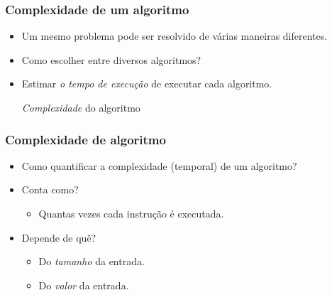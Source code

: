 \documentclass{beamer}
\begin{document}
\begin{frame}

  \frametitle{Complexidade de um algoritmo}

  \begin{itemize}
    \item Um mesmo problema pode ser resolvido de várias maneiras diferentes.
    \item Como escolher entre diversos algoritmos?
    \item Estimar \emph{o tempo de execução\/} de executar cada algoritmo.

      \emph{Complexidade\/} do algoritmo
  \end{itemize}

\end{frame}

\begin{frame}
\frametitle{Complexidade de algoritmo}

\begin{itemize}
\item Como quantificar a complexidade (temporal) de um algoritmo?
\item Conta como?

\pause
\begin{itemize}
  \item Quantas vezes cada instrução é executada.
\end{itemize}

\item Depende de quê?

\pause
\begin{itemize}
\item Do \emph{tamanho\/} da entrada.
\item Do \emph{valor\/} da entrada.
\end{itemize}
\end{itemize}

\end{frame}
\end{document}
